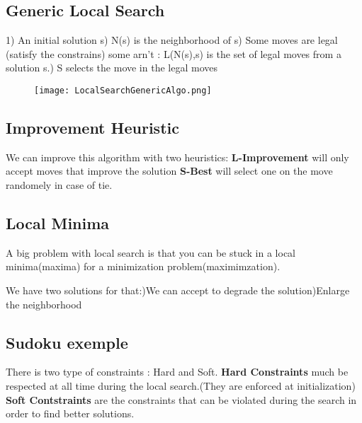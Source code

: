 
\subsection{Generic Local Search}
1) An initial solution s) N(s) is the neighborhood of s) Some moves are legal (satisfy the constrains) some arn't : L(N(s),s) is the set of legal moves from a solution s.) S selects the move in the legal moves


\begin{figure}[!ht]
    \texttt{[image: LocalSearchGenericAlgo.png]}
    \label{fig:Knapsack_example}
\end{figure}
\FloatBarrier
 

\subsection{Improvement Heuristic}
We can improve this algorithm with two heuristics:\newline
\textbf{L-Improvement} will only accept moves that improve the solution\newline
\textbf{S-Best} will select one on the move randomely in case of tie.\newline

\subsection{Local Minima}

A big problem with local search is that you can be stuck in a local minima(maxima) for a minimization problem(maximimzation).\newline

We have two solutions for that:)We can accept to degrade the solution)Enlarge the neighborhood\newline

\subsection{Sudoku exemple}
There is two type of constraints : Hard and Soft.\newline
\textbf{Hard Constraints} much be respected at all time during the local search.(They are enforced at initialization)
\textbf{Soft Contstraints} are the constraints that can be violated during the search in order  to find better solutions.\newline

